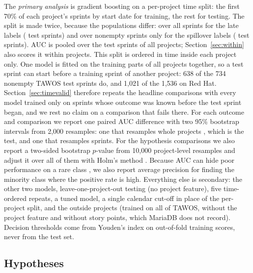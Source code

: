 \documentclass[journal]{IEEEtran}
\begin{document}
The \emph{primary analysis} is gradient boosting on a per-project time split: the first 70\% of each project's sprints by start date for training, the rest for testing. The split is made twice, because the populations differ: over all sprints for the late labels (\TestAll{} test sprints) and over nonempty sprints only for the spillover labels (\TestNonempty{} test sprints). AUC is pooled over the test sprints of all projects; Section~\ref{sec:within} also scores it within projects. This split is ordered in time inside each project only. One model is fitted on the training parts of all projects together, so a test sprint can start before a training sprint of another project: 638 of the 734 nonempty TAWOS test sprints do, and 1,021 of the 1,536 on Red Hat. Section~\ref{sec:timevalid} therefore repeats the headline comparisons with every model trained only on sprints whose outcome was known before the test sprint began, and we rest no claim on a comparison that fails there. For each outcome and comparison we report one paired AUC difference with two 95\% bootstrap intervals from 2,000 resamples: one that resamples whole projects \cite{field2007}, which is the test, and one that resamples sprints. For the hypothesis comparisons we also report a two-sided bootstrap $p$-value from 10,000 project-level resamples and adjust it over all of them with Holm's method \cite{holm1979}. Because AUC can hide poor performance on a rare class \cite{davis2006}, we also report average precision for finding the minority class where the positive rate is high. Everything else is secondary: the other two models, leave-one-project-out testing (no project feature), five time-ordered repeats, a tuned model, a single calendar cut-off in place of the per-project split, and the outside projects (trained on all of TAWOS, without the project feature and without story points, which MariaDB does not record). Decision thresholds come from Youden's index \cite{youden1950} on out-of-fold training scores, never from the test set.

\subsection{Hypotheses}
\end{document}
